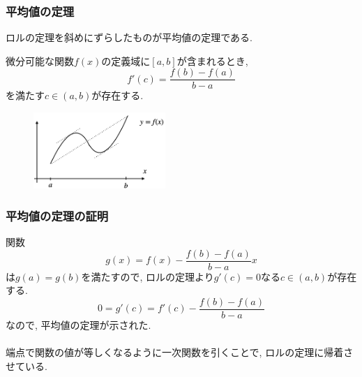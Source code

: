 



\begin{frame}
\frametitle{平均値の定理}

ロルの定理を斜めにずらしたものが平均値の定理である. 

\begin{Thm}[平均値の定理]
微分可能な関数$f(x)$の定義域に$[a,b]$が含まれるとき,
$$
f'(c)=\frac{f(b)-f(a)}{b-a}
$$
を満たす$c \in (a,b)$が存在する. 
\end{Thm}

 \begin{figure}[htbp]
 \begin{center} 
  \includegraphics[width=50mm]{calculus8/Mean.png}
 \end{center}
\end{figure}

\end{frame}








\begin{frame}
\frametitle{平均値の定理の証明}


関数 
$$
g(x)=f(x)-\frac{f(b)-f(a)}{b-a}x
$$
は$g(a)=g(b)$を満たすので, ロルの定理より$g'(c)=0$なる$c \in (a,b)$が存在する. 
$$
0=g'(c)=f'(c)-\frac{f(b)-f(a)}{b-a}
$$
なので, 平均値の定理が示された. \\
\ \\

端点で関数の値が等しくなるように一次関数を引くことで, ロルの定理に帰着させている. 

\end{frame}







